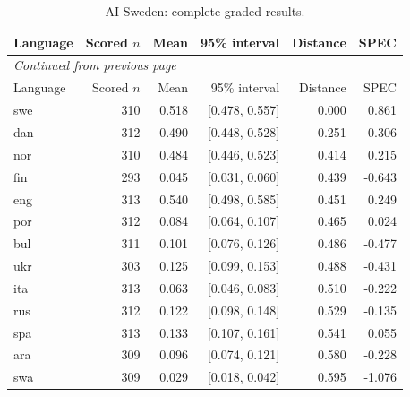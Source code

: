 \endgroup

\begingroup\footnotesize\setlength{\tabcolsep}{3pt}\renewcommand{\arraystretch}{1.12}

\begin{longtable}{lrrrrr}

\caption{AI Sweden: complete graded results.}\label{tab:detail-ai_sweden_llama3_8b}\\

\toprule

Language & Scored $n$ & Mean & 95\% interval & Distance & SPEC\\\midrule

\endfirsthead

\multicolumn{6}{l}{\textit{Continued from previous page}}\\

\toprule

Language & Scored $n$ & Mean & 95\% interval & Distance & SPEC\\\midrule

\endhead

\bottomrule\endfoot

swe & 310 & 0.518 & [0.478, 0.557] & 0.000 & 0.861\\

dan & 312 & 0.490 & [0.448, 0.528] & 0.251 & 0.306\\

nor & 310 & 0.484 & [0.446, 0.523] & 0.414 & 0.215\\

fin & 293 & 0.045 & [0.031, 0.060] & 0.439 & -0.643\\

eng & 313 & 0.540 & [0.498, 0.585] & 0.451 & 0.249\\

por & 312 & 0.084 & [0.064, 0.107] & 0.465 & 0.024\\

bul & 311 & 0.101 & [0.076, 0.126] & 0.486 & -0.477\\

ukr & 303 & 0.125 & [0.099, 0.153] & 0.488 & -0.431\\

ita & 313 & 0.063 & [0.046, 0.083] & 0.510 & -0.222\\

rus & 312 & 0.122 & [0.098, 0.148] & 0.529 & -0.135\\

spa & 313 & 0.133 & [0.107, 0.161] & 0.541 & 0.055\\

ara & 309 & 0.096 & [0.074, 0.121] & 0.580 & -0.228\\

swa & 309 & 0.029 & [0.018, 0.042] & 0.595 & -1.076\\

\end{longtable}

